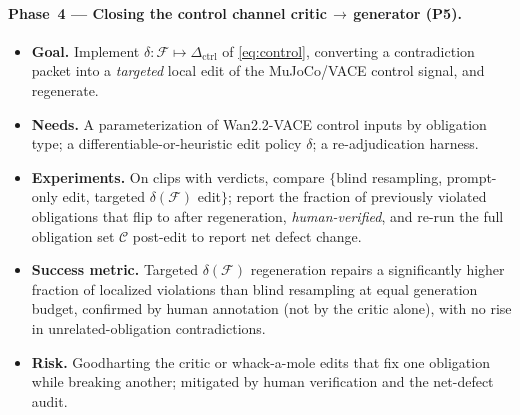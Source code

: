 \paragraph{Phase~4 --- Closing the control channel critic\,$\rightarrow$\,generator (P5).}
\begin{itemize}
  \item \textbf{Goal.} Implement $\delta:\mathcal{F}\mapsto\Delta_{\mathrm{ctrl}}$ of
    \eqref{eq:control}, converting a contradiction packet into a \emph{targeted}
    local edit of the MuJoCo/VACE control signal, and regenerate.
  \item \textbf{Needs.} A parameterization of Wan2.2-VACE control inputs by
    obligation type; a differentiable-or-heuristic edit policy $\delta$; a
    re-adjudication harness.
  \item \textbf{Experiments.} On clips with \contradicted{} verdicts, compare
    $\{$blind resampling, prompt-only edit, targeted $\delta(\mathcal{F})$ edit$\}$; report
    the fraction of previously violated obligations that flip to \supported{}
    after regeneration, \emph{human-verified}, and re-run the full obligation set
    $\mathcal{C}$ post-edit to report net defect change.
  \item \textbf{Success metric.} Targeted $\delta(\mathcal{F})$ regeneration repairs a
    significantly higher fraction of localized violations than blind resampling
    at equal generation budget, confirmed by human annotation (not by the critic
    alone), with no rise in unrelated-obligation contradictions.
  \item \textbf{Risk.} Goodharting the critic or whack-a-mole edits that fix one
    obligation while breaking another; mitigated by human verification and the
    net-defect audit.
\end{itemize}

